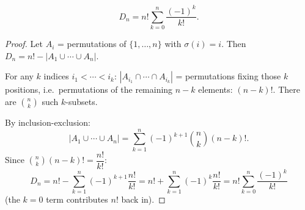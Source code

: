 \begin{theorem}
\label{thm:derangecount}
\[
D_n = n!\sum_{k=0}^n \frac{(-1)^k}{k!}.
\]
\end{theorem}
\begin{proof}
Let $A_i$ = permutations of $\{1,\dots,n\}$ with $\sigma(i)=i$. Then $D_n = n! - |A_1\cup\cdots\cup A_n|$.

For any $k$ indices $i_1<\cdots<i_k$: $|A_{i_1}\cap\cdots\cap A_{i_k}|$ = permutations fixing those $k$ positions, i.e.\ permutations of the remaining $n-k$ elements: $(n-k)!$. There are $\binom{n}{k}$ such $k$-subsets.

By inclusion-exclusion:
\[
|A_1\cup\cdots\cup A_n| = \sum_{k=1}^n (-1)^{k+1}\binom{n}{k}(n-k)!.
\]
Since $\binom{n}{k}(n-k)! = \dfrac{n!}{k!}$:
\[
D_n = n! - \sum_{k=1}^n (-1)^{k+1}\frac{n!}{k!} = n! + \sum_{k=1}^n (-1)^k\frac{n!}{k!} = n!\sum_{k=0}^n \frac{(-1)^k}{k!}
\]
(the $k=0$ term contributes $n!$ back in).
\end{proof}

